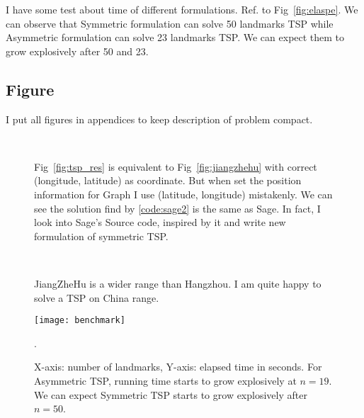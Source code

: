 \documentclass{mcmthesis}
\begin{document}
I have some test about time of different formulations. Ref. to Fig~\vref{fig:elaspe}. We can observe that Symmetric formulation can solve 50 landmarks TSP while Asymmetric formulation can solve 23 landmarks TSP. We can expect them to grow explosively after 50 and 23. 



\begin{appendices}
\section{Figure}
I put all figures in appendices to keep description of problem compact.
\begin{figure}[H]
	\centering
	 \quad  
	  \quad
	\\
	  \quad 
	\caption[Results]{Fig~\vref{fig:tsp_res} is equivalent to Fig~\vref{fig:jiangzhehu} with correct (longitude, latitude) as coordinate. But when set the position information for Graph I use (latitude, longitude) mistakenly. We can see the solution find by \vref{code:sage2} is the same as Sage. In fact, I look into Sage's Source code, inspired by it and write new  formulation of symmetric TSP.} 
\end{figure}
\begin{figure}[H]
	\centering
	 \   
	\caption[Results]{JiangZheHu is a wider range than Hangzhou. I am quite happy to solve a TSP on China range.} 
\end{figure}
\begin{figure}[H]
	\centering
	\texttt{[image: benchmark]}
	\caption[Running time]{X-axis: number of landmarks, Y-axis: elapsed time in seconds. For Asymmetric TSP, running time starts to grow explosively at $n=19$.  We can expect Symmetric TSP starts to grow explosively after $n=50$.}
	\label{fig:elaspe}.
\end{figure}

\end{appendices}
\end{document}
